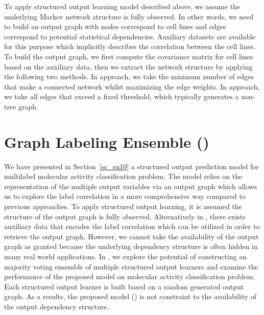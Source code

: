 {%
To apply structured output learning model described above, we assume the underlying Markov network structure is fully observed.
In other words, we need to build an output graph with nodes correspond to cell lines and edges correspond to potential statistical dependencies.
Auxiliary datasets are available for this purpose \citep{Shoemaker06the} which implicitly describes the correlation between the cell lines.
To build the output graph, we first compute the covariance matrix for cell lines based on the auxiliary data, then we extract the network structure by applying the following two methods.
In  approach, we take the minimum number of edges that make a connected network whilst maximizing the edge weights.
In  approach, we take all edges that exceed a fixed threshold, which typically generates a non-tree graph.



%
%
\section{Graph Labeling Ensemble (\mve)}\label{sc_su11}

We have presented in Section~\ref{sc_su10} a structured output prediction model for multilabel molecular activity classification problem.
The model relies on the representation of the multiple output variables via an output graph which allows us to explore the label correlation in a more comprehensive way compared to previous approaches.
To apply structured output learning, it is assumed the structure of the output graph is fully observed.
Alternatively in , there exists auxiliary data that encodes the label correlation which can be utilized in order to retrieve the output graph.
However, we cannot take the availability of the output graph as granted because the underlying dependency structure is often hidden in many real world applications.
In , we explore the potential of constructing an majority voting ensemble of multiple structured output learners and examine the performance of the proposed model on molecular activity classification problem.
Each structured output learner is built based on a random generated output graph.
As a results, the proposed model (\mve) is not constraint to the availability of the output dependency structure.



}
